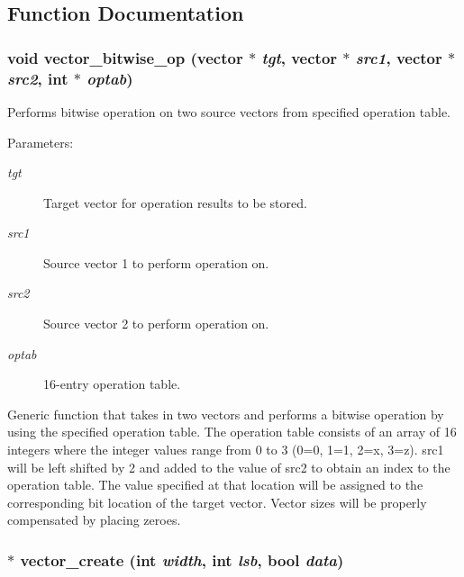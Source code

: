 \subsection{Function Documentation}
\subsubsection{\setlength{\rightskip}{0pt plus 5cm}void vector\_\-bitwise\_\-op ({\bf vector} $\ast$ {\em tgt}, {\bf vector} $\ast$ {\em src1}, {\bf vector} $\ast$ {\em src2}, int $\ast$ {\em optab})}\label{vector_8h_a19}


Performs bitwise operation on two source vectors from specified operation table.

\begin{Desc}
\item[Parameters: ]\par
\begin{description}
\item[{\em 
tgt}]Target vector for operation results to be stored. \item[{\em 
src1}]Source vector 1 to perform operation on. \item[{\em 
src2}]Source vector 2 to perform operation on. \item[{\em 
optab}]16-entry operation table.\end{description}
\end{Desc}
Generic function that takes in two vectors and performs a bitwise operation by using the specified operation table. The operation table consists of an array of 16 integers where the integer values range from 0 to 3 (0=0, 1=1, 2=x, 3=z). src1 will be left shifted by 2 and added to the value of src2 to obtain an index to the operation table. The value specified at that location will be assigned to the corresponding bit location of the target vector. Vector sizes will be properly compensated by placing zeroes. 
\subsubsection{$\ast$ vector\_\-create (int {\em width}, int {\em lsb}, {\bf bool} {\em data})}\label{vector_8h_a1}



